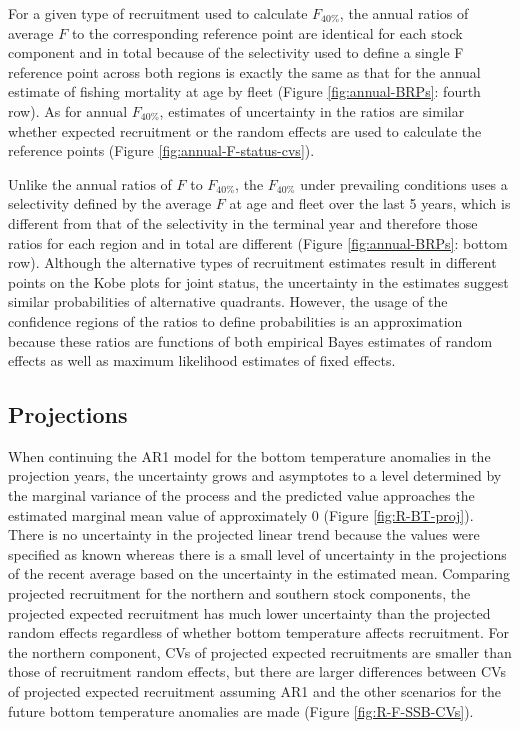 \documentclass[
]{article}
\begin{document}
For a given type of recruitment used to calculate \(F_{40\%}\), the annual ratios of average \(F\) to the corresponding reference point are identical for each stock component and in total because of the selectivity used to define a single F reference point across both regions is exactly the same as that for the annual estimate of fishing mortality at age by fleet (Figure \ref{fig:annual-BRPs}: fourth row). As for annual \(F_{40\%}\), estimates of uncertainty in the ratios are similar whether expected recruitment or the random effects are used to calculate the reference points (Figure \ref{fig:annual-F-status-cvs}).

Unlike the annual ratios of \(F\) to \(F_{40\%}\), the \(F_{40\%}\) under prevailing conditions uses a selectivity defined by the average \(F\) at age and fleet over the last 5 years, which is different from that of the selectivity in the terminal year and therefore those ratios for each region and in total are different (Figure \ref{fig:annual-BRPs}: bottom row). Although the alternative types of recruitment estimates result in different points on the Kobe plots for joint status, the uncertainty in the estimates suggest similar probabilities of alternative quadrants. However, the usage of the confidence regions of the ratios to define probabilities is an approximation because these ratios are functions of both empirical Bayes estimates of random effects as well as maximum likelihood estimates of fixed effects.

\hypertarget{projections-1}{%
\subsection*{Projections}\label{projections-1}}

When continuing the AR1 model for the bottom temperature anomalies in the projection years, the uncertainty grows and asymptotes to a level determined by the marginal variance of the process and the predicted value approaches the estimated marginal mean value of approximately 0 (Figure \ref{fig:R-BT-proj}). There is no uncertainty in the projected linear trend because the values were specified as known whereas there is a small level of uncertainty in the projections of the recent average based on the uncertainty in the estimated mean. Comparing projected recruitment for the northern and southern stock components, the projected expected recruitment has much lower uncertainty than the projected random effects regardless of whether bottom temperature affects recruitment. For the northern component, CVs of projected expected recruitments are smaller than those of recruitment random effects, but there are larger differences between CVs of projected expected recruitment assuming AR1 and the other scenarios for the future bottom temperature anomalies are made (Figure \ref{fig:R-F-SSB-CVs}).
\end{document}
